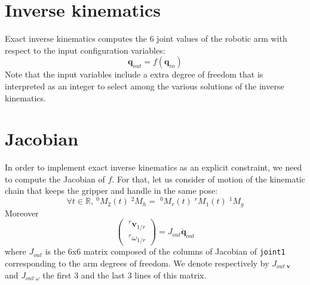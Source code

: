 \documentclass{article}
\newcommand\linvel{\mathbf{v}}
\newcommand\conf{\mathbf{q}}
\newcommand\reals{\mathbb{R}}
\begin{document}
\section{Inverse kinematics}

Exact inverse kinematics computes the 6 joint values of the robotic arm with
respect to the input configuration variables:
\begin{equation}\label{eq:inverse-kinematics}
  \conf_{out} = f(\conf_{in})
\end{equation}
Note that the input variables include a extra degree of freedom that is interpreted as an integer to select among the various solutions of the inverse kinematics.

\section{Jacobian}

In order to implement exact inverse kinematics as an explicit constraint, we need to compute the Jacobian of $f$. For that, let us consider of motion of the kinematic chain that keeps the gripper and handle in the same pose:
\begin{equation}\label{eq:jac1}
\forall t\in\reals,\ ^0M_2(t)\;^2M_h = \;^0M_r(t) \;^rM_1(t)\;^1M_g
\end{equation}
Moreover
\begin{equation}\label{eq:jacobian arm}
\left(\begin{array}{c}
  \;^r\linvel_{1/r} \\ \;^r\omega_{1/r}
\end{array}\right) =
J_{out} \dot{\conf}_{out}
\end{equation}
where $J_{out}$ is the 6x6 matrix composed of the columns of Jacobian of \texttt{joint1} corresponding to the arm degrees of freedom. We denote respectively by $J_{out\;\linvel}$ and $J_{out\;\omega}$ the first 3 and the last 3 lines of this matrix.
\end{document}
